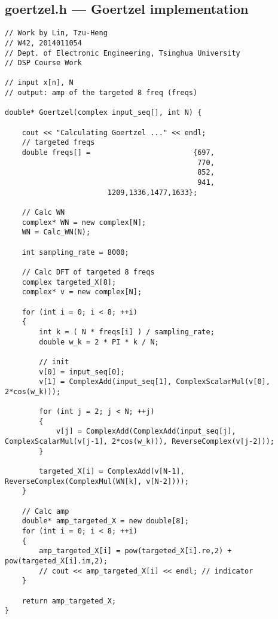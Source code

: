 \subsection{goertzel.h --- Goertzel implementation}\label{code:goertzel}
\begin{lstlisting}
// Work by Lin, Tzu-Heng
// W42, 2014011054
// Dept. of Electronic Engineering, Tsinghua University
// DSP Course Work

// input x[n], N
// output: amp of the targeted 8 freq (freqs)

double* Goertzel(complex input_seq[], int N) {

	cout << "Calculating Goertzel ..." << endl;
	// targeted freqs
	double freqs[] = 				 		{697,
									  		 770,
									  		 852,
									  		 941,
						1209,1336,1477,1633};

	// Calc WN
	complex* WN = new complex[N];
	WN = Calc_WN(N);

	int sampling_rate = 8000;

	// Calc DFT of targeted 8 freqs
	complex targeted_X[8];
	complex* v = new complex[N];

	for (int i = 0; i < 8; ++i)
	{	
		int k = ( N * freqs[i] ) / sampling_rate;
		double w_k = 2 * PI * k / N;

		// init
		v[0] = input_seq[0];
		v[1] = ComplexAdd(input_seq[1], ComplexScalarMul(v[0], 2*cos(w_k)));

		for (int j = 2; j < N; ++j)
		{
			v[j] = ComplexAdd(ComplexAdd(input_seq[j], ComplexScalarMul(v[j-1], 2*cos(w_k))), ReverseComplex(v[j-2]));
		}

		targeted_X[i] = ComplexAdd(v[N-1], ReverseComplex(ComplexMul(WN[k], v[N-2])));
	}

	// Calc amp
	double* amp_targeted_X = new double[8];
	for (int i = 0; i < 8; ++i)
	{
		amp_targeted_X[i] = pow(targeted_X[i].re,2) + pow(targeted_X[i].im,2);
		// cout << amp_targeted_X[i] << endl; // indicator
	}

	return amp_targeted_X; 
}
\end{lstlisting}


